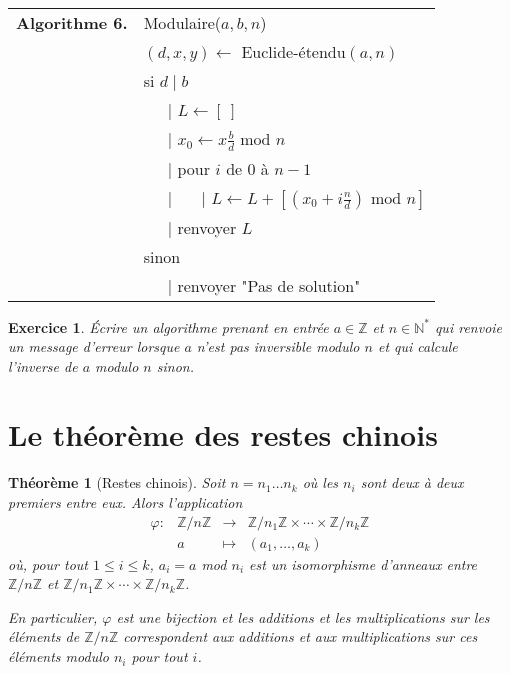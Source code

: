 \documentclass[10pt,a4paper]{report}
\newtheorem{thm}{Théorème}[chapter]
\newtheorem*{exo}{Exercice}
\begin{document}
\begin{tabular}{ll}
\textbf{Algorithme 6.} & Modulaire($a,b,n$)\\
           & $(d,x,y)\leftarrow  $ Euclide-étendu$(a,n)$  \\
           & si $d \mid b$           \\
           & \ \ \ {\rm | } $ L \leftarrow [ \ ]  $  \\
           & \ \ \ {\rm | } $x_0 \leftarrow  x \tfrac{b}{d} \text{ mod }n $ \\
           & \ \ \ {\rm | }pour $i$ de 0 à $n-1$ \\
           & \ \ \ {\rm | } \ \ \ {\rm | } $L \leftarrow  L+  [(x_0 + i\tfrac{n}{d}) \text{ mod }n  ]$ \\    
           & \ \ \ {\rm | } renvoyer $L$ \\
           &  sinon \\
           &  \ \ \ {\rm | } renvoyer "Pas de solution" 
\end{tabular}


\begin{exo}
Écrire un algorithme prenant en entrée $a\in \mathbb{Z}$ et $n\in \mathbb{N}^*$ qui renvoie un message d'erreur lorsque $a$ n'est pas inversible modulo $n$ et qui calcule l'inverse de $a$ modulo $n$ sinon.
\end{exo}


\section{Le théorème des restes chinois}

\begin{thm}[Restes chinois]\label{T29}
Soit $n=n_1 \ldots n_k$ où les $n_i$ sont deux à deux premiers entre eux. Alors l'application
\begin{equation*}
\begin{array}{cccc}
\varphi : &  \mathbb{Z}/n \mathbb{Z}  &   \longrightarrow & \mathbb{Z}/n_1 \mathbb{Z} \times \cdots   \times \mathbb{Z}/n_k \mathbb{Z}  \\
            & a &  \longmapsto  & (a_1,  \ldots , a_k) 
\end{array}
\end{equation*}
où, pour tout $1 \leqslant i \leqslant k$, $a_i=a$ mod $n_i$ est un isomorphisme d'anneaux entre $\mathbb{Z}/n \mathbb{Z}$ et $\mathbb{Z}/n_1 \mathbb{Z} \times \cdots   \times \mathbb{Z}/n_k \mathbb{Z} $.\par 
En particulier, $\varphi$ est une bijection et les additions et les multiplications sur les éléments de $\mathbb{Z}/n\mathbb{Z}$ correspondent aux additions et aux multiplications sur ces éléments modulo $n_i$ pour tout $i$.

\end{thm}
\end{document}
